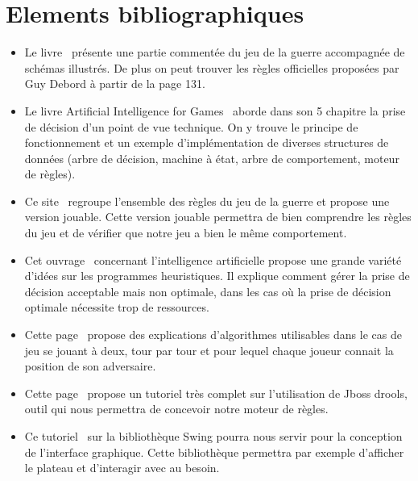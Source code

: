 \chapter{Elements bibliographiques}

	\begin{itemize}

		\item Le livre~\cite{ref1} présente une partie commentée du jeu de la guerre accompagnée de schémas illustrés. 
		De plus on peut trouver les règles officielles proposées par Guy Debord à partir de la page 131.
		\\[0.7\baselineskip]

		\item Le livre Artificial Intelligence for Games~\cite{ref2} aborde dans son 5 chapitre la prise de décision d'un point de vue technique. 
		On y trouve le principe de fonctionnement et un exemple d'implémentation de diverses structures de données (arbre de décision, machine à état, 
		arbre de comportement, moteur de règles).
		\\[0.7\baselineskip]

		\item Ce site~\cite{ref3} regroupe l'ensemble des règles du jeu de la guerre et propose une version jouable. Cette version jouable permettra 
		de bien comprendre les règles du jeu et de vérifier que notre jeu a bien le même comportement.
		\\[0.7\baselineskip]

		\item Cet ouvrage~\cite{ref4} concernant l'intelligence artificielle propose une grande variété d'idées sur les programmes heuristiques. 
		Il explique comment gérer la prise de décision acceptable mais non optimale, dans les cas où la prise de décision optimale nécessite trop de ressources.
		\\[0.7\baselineskip]

		\item Cette page~\cite{ref5} propose des explications d'algorithmes utilisables dans le cas de jeu se jouant à deux, tour par tour et 
		pour lequel chaque joueur connait la position de son adversaire.
		\\[0.7\baselineskip]

		\item Cette page~\cite{ref6} propose un tutoriel très complet sur l'utilisation de Jboss drools, outil qui nous permettra de concevoir notre moteur de règles.
		\\[0.7\baselineskip]

		\item Ce tutoriel~\cite{ref7} sur la bibliothèque Swing pourra nous servir pour la conception de l'interface graphique. Cette bibliothèque 
		permettra par exemple d'afficher le plateau et d'interagir avec au besoin.
		\\[0.7\baselineskip]

	\end{itemize}